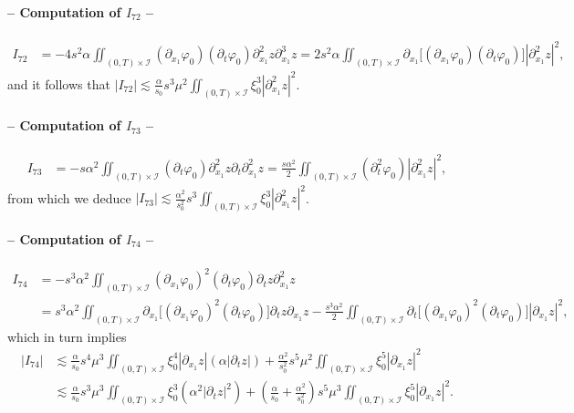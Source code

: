 \documentclass[a4paper, 12pt]{article}
\theoremstyle{plain}
\theoremstyle{definition}
\numberwithin{theorem}{section}
\numberwithin{equation}{section}
\begin{document}
{\paragraph{-- Computation of $I_{72}$ --}
\begin{align*}
I_{72}&=-4s^2\alpha\iint_{(0,T)\times\mathcal{I}}(\partial_{x_1}\varphi_0)(\partial_t\varphi_0)\partial^2_{x_1}z\partial^3_{x_1}z=2 s^2\alpha \iint_{(0,T)\times\mathcal{I}}\partial_{x_1}\big[(\partial_{x_1}\varphi_0)(\partial_t\varphi_0)\big]|\partial^2_{x_1}z|^2,\end{align*}
and it follows that
$ \displaystyle |I_{72}|\lesssim \frac{\alpha}{s_0} s^3\mu^2\iint_{(0,T)\times\mathcal{I}}\xi_0^3|\partial^2_{x_1}z|^2$.

\paragraph{-- Computation of $I_{73}$ --}
\begin{align*}
 I_{73}&=-s\alpha^2 \iint_{(0,T)\times\mathcal{I}} (\partial_t\varphi_0)\partial^2_{x_1}z\partial_t\partial^2_{x_1}z=\frac{s\alpha^2}{2} \iint_{(0,T)\times\mathcal{I}} (\partial^2_t\varphi_0)|\partial^2_{x_1}z|^2, \end{align*}
 from which we deduce
 $\displaystyle |I_{73}| \lesssim \frac{\alpha^2}{s_0^2} s^3\iint_{(0,T)\times\mathcal{I}}\xi_0^3|\partial^2_{x_1}z|^2$.

\paragraph{-- Computation of $I_{74}$ --}
\begin{align*}
  I_{74}&= -s^3\alpha^2 \iint_{(0,T)\times\mathcal{I}} (\partial_{x_1}\varphi_0)^2(\partial_t\varphi_0)\partial_tz\partial^2_{x_1}z\\
  &=s^3\alpha^2 \iint_{(0,T)\times\mathcal{I}} \partial_{x_1}\big[(\partial_{x_1}\varphi_0)^2(\partial_t\varphi_0)\big]\partial_tz\partial_{x_1}z-\frac{s^3\alpha^2}{2}\iint_{(0,T)\times\mathcal{I}}\partial_t\big[(\partial_{x_1}\varphi_0)^2(\partial_t\varphi_0)\big]|\partial_{x_1}z|^2,\end{align*}
  which in turn implies
  \begin{align*}
  |I_{74}| &\lesssim \frac{\alpha}{s_0} s^4\mu^3\iint_{(0,T)\times\mathcal{I}}\xi_0^4|\partial_{x_1}z|(\alpha |\partial_tz|)+\frac{\alpha^2}{s_0^2} s^5\mu^2\iint_{(0,T)\times\mathcal{I}}\xi_0^5|\partial_{x_1}z|^2\\
  &\lesssim \frac{\alpha}{s_0} s^3\mu^3\iint_{(0,T)\times\mathcal{I}}\xi_0^3(\alpha^2 |\partial_tz|^2)+\left(\frac{\alpha}{s_0}+\frac{\alpha^2}{s_0^2}\right) s^5\mu^3\iint_{(0,T)\times\mathcal{I}}\xi_0^5|\partial_{x_1}z|^2.
\end{align*}
}
\end{document}
